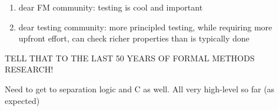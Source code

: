 \documentclass[withindex,glossary]{cam-thesis}
\newcommand\TODO[1]{}
\newcommand\TODO[1]{{\color{violet}TODO: #1}}
\begin{document}
\begin{enumerate}
  \item dear FM community: testing is cool and important
  \item dear testing community: more principled testing, while requiring more upfront effort, can check richer properties than is typically done 
\end{enumerate}

TELL THAT TO THE LAST 50 YEARS OF FORMAL METHODS RESEARCH!


Need to get to separation logic and C as well. All very high-level so far (as expected)




%

\TODO{Mention single isolated approach and tool problem. Tackling having all of these in one place? One aiding the other? \emph{Do more work to bridge the two for my thesis?}}

\TODO{Somewhere: Matt Parkinson comment on inward and outward facing specifications? More on \emph{specifications} in my thesis? Maybe in future work/limitations section. The quality of Fulminate's checking is directly correlated with the CN toolchain's specification language -- needs to now work for testing \emph{and} proof}


\TODO{Put a diagram of the spectrum of assurance methods. Even just a horizontal line to start with is fine; can also do something like what's in the Hoare Logic slides}


\end{document}
